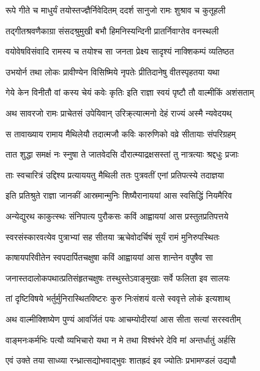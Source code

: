 \twolineshloka
{रूपे गीते च माधुर्यं तयोस्तज्ज्ञैर्निवेदितम्}
{ददर्श सानुजो रामः शुश्राव च कुतूहली}%

\twolineshloka
{तद्गीतश्रवणैकाग्रा संसदश्रुमुखी बभौ}
{हिमनिस्यन्दिनी प्रातर्निवाग्तेव वनस्थली}%

\twolineshloka
{वयोवेषविसंवादि रामस्य च तयोश्च सा}
{जनता प्रेक्ष्य सादृश्यं नाक्शिकम्पं व्यतिष्ठत}%

\twolineshloka
{उभयोर्न तथा लोकः प्रावीण्येन विसिष्मिये}
{नृपतेः प्रीतिदानेषु वीतस्पृहतया यथा}%

\twolineshloka
{गेये केन विनीतौ वां कस्य चेयं कवेः कृतिः}
{इति राज्ञा स्वयं पृष्टौ तौ वाल्मीकिं अशंसताम्}%

\twolineshloka
{अथ सावरजो रामः प्राचेतसं उपेयिवान्}
{उरिक्र्त्यात्मनो देहं राज्यं अस्मै न्यवेदयथ्}%

\twolineshloka
{स तावाख्याय रामाय मैथिलेयौ तदात्मजौ}
{कविः कारुणिको वव्रे सीतायाः संपरिग्रहम्}%

\twolineshloka
{तात शुद्धा समक्षं नः स्नुषा ते जातवेदसि}
{दौरात्म्याद्रक्षसस्तां तु नात्रत्याः श्रद्दधुः प्रजाः}%

\twolineshloka
{ताः स्वचारित्रं उद्दिश्य प्रत्याययतु मैथिली}
{ततः पुत्रवतीं एनां प्रतिपत्स्ये तदाज्ञया}%

\twolineshloka
{इति प्रतिश्रुते राज्ञा जानकीं आस्रमान्मुनिः}
{शिष्यैरानाययां आस स्वसिद्धिं नियमैरिव}%

\twolineshloka
{अन्येद्युरथ काकुत्स्थः संनिपात्य पुरौकसः}
{कविं आह्वाययां आस प्रस्तुतप्रतिपत्तये}%

\twolineshloka
{स्वरसंस्कारवत्येव पुत्राभ्यां सह सीतया}
{ऋचेवोदर्चिषं सूर्यं रामं मुनिरुपस्थितः}%

\twolineshloka
{काषायपरिवीतेन स्वपदार्पितचक्षुषा}
{कविं आह्वाययां आस शान्तेन वपुषैव सा}%

\twolineshloka
{जनास्तदालोकपथात्प्रतिसंहृतचक्षुषः}
{तस्थुस्तेऽवाङ्मुखाः सर्वे फलिता इव सालयः}%

\twolineshloka
{तां दृष्टिविषये भर्तुर्मुनिरास्थितविष्टरः}
{कुरु निःसंशयं वत्से स्ववृत्ते लोकं इत्यशाथ्}%

\twolineshloka
{अथ वाल्मीक्शिष्येण पुण्यं आवर्जितं पयः}
{आचम्योदीरयां आस सीता सत्यां सरस्वतीम्}%

\twolineshloka
{वाङ्मनःकर्मभिः पत्यौ व्यभिचारो यथा न मे}
{तथा विश्वंभरे देवि मां अन्तर्धातुं अर्हसि}%

\twolineshloka
{एवं उक्ते तया साध्व्या रन्ध्रात्सद्योभवाद्भुवः}
{शातह्रदं इव ज्योतिः प्रभामण्डलं उद्ययौ}%

